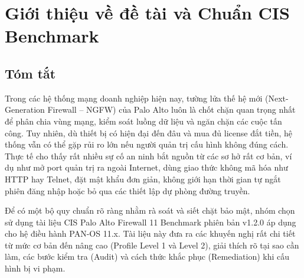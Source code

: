 \documentclass[12pt,a4paper]{article}
\makeatletter
\renewcommand{\lstlistoflistings}{%
  \begingroup
  \parskip\z@ \parindent\z@
  \section*{\centering\fontsize{21}{26}\selectfont\bfseries\color{UITBlue}\lstlistlistingname}%
  \noindent{\color{UITBlue}\rule{\textwidth}{1pt}}\par\vspace{0.4cm}
  \@starttoc{lol}%
  \endgroup
}
\renewcommand{\lstlistlistingname}{\makebox[\textwidth][c]{DANH MỤC MÃ NGUỒN}}
\makeatother
\begin{document}
\clearpage

\pagestyle{uit-toc}
\tableofcontents
\clearpage

\thispagestyle{uit-toc}
{}
\listoftables
\clearpage

\thispagestyle{uit-toc}
{}
\listoffigures
\clearpage

\thispagestyle{uit-toc}
{}
\lstlistoflistings
\clearpage

\pagestyle{fancy}

\section{Giới thiệu về đề tài và Chuẩn CIS Benchmark}

\subsection{Tóm tắt}
\noindent Trong các hệ thống mạng doanh nghiệp hiện nay, tường lửa thế hệ mới (Next-Generation Firewall -- NGFW) của Palo Alto luôn là chốt chặn quan trọng nhất để phân chia vùng mạng, kiểm soát luồng dữ liệu và ngăn chặn các cuộc tấn công. Tuy nhiên, dù thiết bị có hiện đại đến đâu và mua đủ license đắt tiền, hệ thống vẫn có thể gặp rủi ro lớn nếu người quản trị cấu hình không đúng cách. Thực tế cho thấy rất nhiều sự cố an ninh bắt nguồn từ các sơ hở rất cơ bản, ví dụ như mở port quản trị ra ngoài Internet, dùng giao thức không mã hóa như HTTP hay Telnet, đặt mật khẩu đơn giản, không giới hạn thời gian tự ngắt phiên đăng nhập hoặc bỏ qua các thiết lập dự phòng đường truyền.

\vspace{0.3cm}

\noindent Để có một bộ quy chuẩn rõ ràng nhằm rà soát và siết chặt bảo mật, nhóm chọn sử dụng tài liệu CIS Palo Alto Firewall 11 Benchmark phiên bản v1.2.0 áp dụng cho hệ điều hành PAN-OS 11.x. Tài liệu này đưa ra các khuyến nghị rất chi tiết từ mức cơ bản đến nâng cao (Profile Level 1 và Level 2), giải thích rõ tại sao cần làm, các bước kiểm tra (Audit) và cách thức khắc phục (Remediation) khi cấu hình bị vi phạm.

\vspace{0.3cm}
\end{document}
